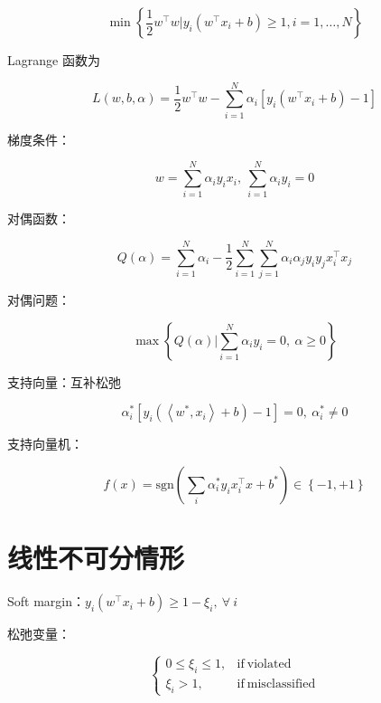 \documentclass[openany,a4paper,12pt]{ctexbook}
\theoremstyle{kaiti}
\theoremstyle{normal}
\begin{document}
\begin{equation}
  \min \left\{\frac{1}{2}w^{\top}w|y_i\left(w^{\top}x_i+b \right)\geqslant 1, i=1,\dots ,N \right\}
\end{equation}

Lagrange 函数为

\begin{equation}
  L\left(w,b,\alpha \right)=\frac{1}{2}w^{\top}w-\sum_{i=1}^{N}\alpha_i\left[y_i\left(w^{\top}x_i+b \right)-1 \right]
\end{equation}

梯度条件：

\begin{equation}
  w=\sum_{i=1}^{N}\alpha_iy_ix_i,~\sum_{i=1}^{N}\alpha_iy_i=0
\end{equation}

对偶函数：

\begin{equation}
  Q\left(\alpha \right)=\sum_{i=1}^{N}\alpha_i-\frac{1}{2}\sum_{i=1}^{N}\sum_{j=1}^{N}\alpha_i\alpha_jy_iy_jx_{i}^{\top}x_j
\end{equation}

对偶问题：

\begin{equation}
  \max \left\{ Q\left(\alpha \right)|\sum_{i=1}^{N}\alpha_iy_i=0,~\alpha \geqslant 0 \right\}
\end{equation}

支持向量：互补松弛

\begin{equation}
  \alpha_{i}^{*}\left[y_i\left(\left< w^*,x_i \right> +b \right)-1 \right] =0,~\alpha_{i}^{*}\ne 0
\end{equation}

支持向量机：

\begin{equation}
  f(x)=\mathrm{sgn} \left(\sum_i\alpha_{i}^{*}y_ix_{i}^{\top}x+b^* \right)\in \left\{ -1,+1 \right\}
\end{equation}

\section{线性不可分情形}

Soft margin：$y_i\left(w^{\top}x_i+b \right)\geqslant 1-\xi_i,~\forall~i$

松弛变量：

\begin{equation}
  \begin{cases}
    0\leqslant \xi_i\leqslant 1, &\mathrm{if}~\mathrm{violated}\\
    \xi_i>1, &\mathrm{if}~\mathrm{misclassified}
  \end{cases}
\end{equation}
\end{document}
